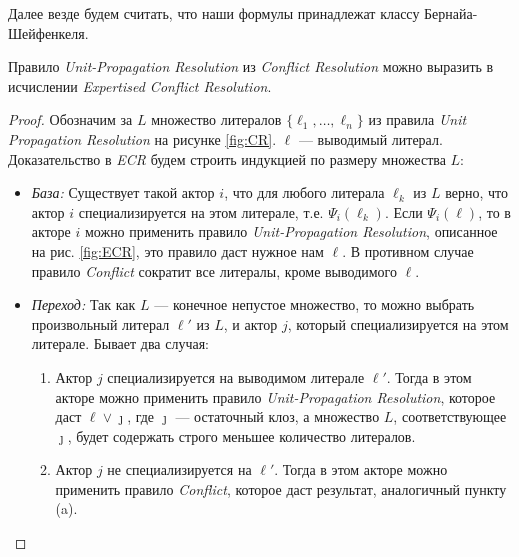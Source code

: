\label{sec:bsh-proof}
Далее везде будем считать, что наши формулы принадлежат классу Бернайа-Шейфенкеля. 


\begin{lemma}
\label{lem:upr}
Правило \emph{Unit-Propagation Resolution} из \emph{Conflict Resolution} можно выразить в исчислении \emph{Expertised Conflict Resolution}.
\end{lemma}
\begin{proof}
Обозначим за $L$ множество литералов $\{\ell_1, \ldots, \ell_n\}$ из правила \emph{Unit Propagation Resolution} на рисунке \ref{fig:CR}. $\ell$ --- выводимый литерал.
Доказательство в \emph{ECR} будем строить индукцией по размеру множества $L$:
\begin{itemize}[label=$\star$]
	\item \emph{База:} Существует такой актор $i$, что для любого литерала $\ell_k$ из $L$ верно, что актор $i$ специализируется на этом литерале, т.е. $\Psi_i(\ell_k)$. Если $\Psi_i(\ell)$, то в акторе $i$ можно применить правило \emph{Unit-Propagation Resolution}, описанное на рис. \ref{fig:ECR}, это правило даст нужное нам $\ell$. В противном случае правило \emph{Conflict} сократит все литералы, кроме выводимого $\ell$.
    \item \emph{Переход:} Так как $L$ --- конечное непустое множество, то можно выбрать произвольный литерал $\ell'$ из $L$, и актор $j$, который специализируется на этом литерале. Бывает два случая:
    \begin{enumerate}
    	\item Актор $j$ специализируется на выводимом литерале $\ell'$. Тогда в этом акторе можно применить правило \emph{Unit-Propagation Resolution}, которое даст $\ell \vee \jmath$, где $\jmath$ --- остаточный клоз, а множество $L$, соответствующее $\jmath$, будет содержать строго меньшее количество литералов.
        \item Актор $j$ не специализируется на $\ell'$. Тогда в этом акторе можно применить правило \emph{Conflict}, которое даст результат, аналогичный пункту (a).
    \end{enumerate} 
\end{itemize}
\end{proof}

